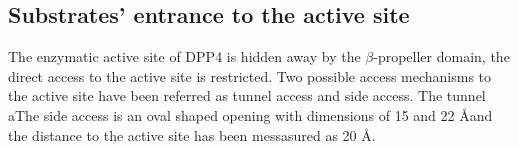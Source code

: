 \subsection{Substrates' entrance to the active site}

The enzymatic active site of DPP4 is hidden away by the $\beta$-propeller domain, the direct access to the active site is restricted. Two possible access mechanisms to the active site have been referred as tunnel access and side access. The tunnel aThe side access is an oval shaped opening with dimensions of 15 and 22 \AA and the distance to the active site has been messasured as 20 \AA.~\cite{Engel_2003}